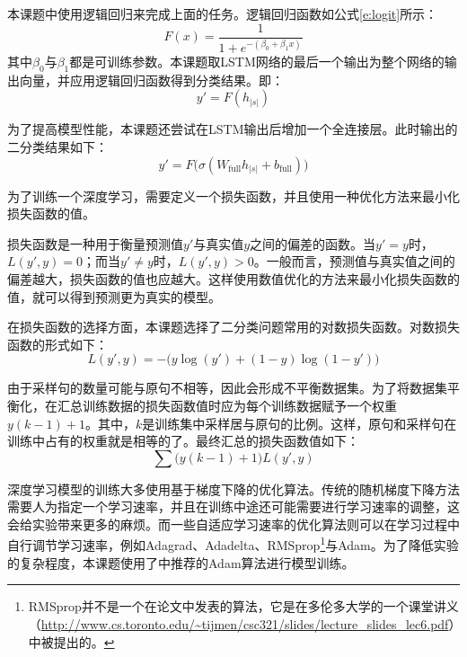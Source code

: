 本课题中使用逻辑回归来完成上面的任务。逻辑回归函数如公式\ref{e:logit}所示：
\begin{equation}
F(x) = \frac{1}{1 + e^{-(\beta_0 + \beta_1 x)}}
\label{e:logit}
\end{equation}
其中$\beta_0$与$\beta_1$都是可训练参数。本课题取LSTM网络的最后一个输出为整个网络的输出向量，并应用逻辑回归函数得到分类结果。即：
\begin{equation}
y' = F(h_{|s|})
\end{equation}

为了提高模型性能，本课题还尝试在LSTM输出后增加一个全连接层。此时输出的二分类结果如下：
\begin{equation}
y' = F\bigl(\sigma(W_\text{full} h_{|s|} + b_\text{full})\bigr)
\end{equation}

\label{s:classifer p-training}
为了训练一个深度学习，需要定义一个损失函数，并且使用一种优化方法来最小化损失函数的值。

损失函数是一种用于衡量预测值$y'$与真实值$y$之间的偏差的函数。当$y' = y$时，$L(y', y) = 0$；而当$y' \neq y$时，$L(y', y) > 0$。一般而言，预测值与真实值之间的偏差越大，损失函数的值也应越大。这样使用数值优化的方法来最小化损失函数的值，就可以得到预测更为真实的模型。

在损失函数的选择方面，本课题选择了二分类问题常用的对数损失函数。对数损失函数的形式如下：
\begin{equation}
L(y', y) = -\bigl(y \log(y') + (1 - y) \log(1 - y')\bigr)
\end{equation}

由于采样句的数量可能与原句不相等，因此会形成不平衡数据集。为了将数据集平衡化，在汇总训练数据的损失函数值时应为每个训练数据赋予一个权重$y(k - 1) + 1$。其中，$k$是训练集中采样居与原句的比例。这样，原句和采样句在训练中占有的权重就是相等的了。最终汇总的损失函数值如下：
\begin{equation}
\sum\bigl(y(k - 1) + 1\bigr) L(y', y)
\end{equation}

深度学习模型的训练大多使用基于梯度下降的优化算法。传统的随机梯度下降方法需要人为指定一个学习速率，并且在训练中途还可能需要进行学习速率的调整，这会给实验带来更多的麻烦。而一些自适应学习速率的优化算法则可以在学习过程中自行调节学习速率，例如Adagrad、Adadelta、RMSprop\footnote{RMSprop并不是一个在论文中发表的算法，它是在多伦多大学的一个课堂讲义（\url{http://www.cs.toronto.edu/~tijmen/csc321/slides/lecture_slides_lec6.pdf}）中被提出的。}与Adam。为了降低实验的复杂程度，本课题使用了\cite{Ruder2016}中推荐的Adam算法进行模型训练。

